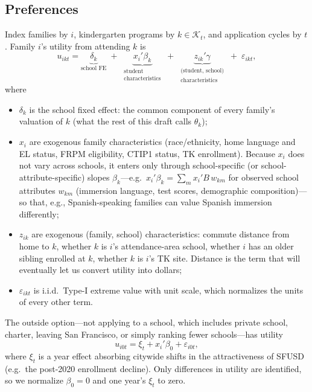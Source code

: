 \documentclass{article}
\begin{document}
\subsection{Preferences}
Index families by $i$, kindergarten programs by $k \in \mathcal{K}_t$, and application cycles by $t$. Family $i$'s utility from attending $k$ is
\[
u_{ikt} = \underbrace{\delta_k}_{\text{school FE}} \; + \; \underbrace{x_i'\beta_k}_{\substack{\text{student} \\ \text{characteristics}}} \; + \; \underbrace{z_{ik}'\gamma}_{\substack{\text{(student, school)} \\ \text{characteristics}}} \; + \; \varepsilon_{ikt},
\]
where
\begin{itemize}
    \item $\delta_k$ is the school fixed effect: the common component of every family's valuation of $k$ (what the rest of this draft calls $\theta_k$);
    \item $x_i$ are exogenous family characteristics (race/ethnicity, home language and EL status, FRPM eligibility, CTIP1 status, TK enrollment). Because $x_i$ does not vary across schools, it enters only through school-specific (or school-attribute-specific) slopes $\beta_k$---e.g.\ $x_i'\beta_k = \sum_m x_i' B\, w_{km}$ for observed school attributes $w_{km}$ (immersion language, test scores, demographic composition)---so that, e.g., Spanish-speaking families can value Spanish immersion differently;
    \item $z_{ik}$ are exogenous (family, school) characteristics: commute distance from home to $k$, whether $k$ is $i$'s attendance-area school, whether $i$ has an older sibling enrolled at $k$, whether $k$ is $i$'s TK site. Distance is the term that will eventually let us convert utility into dollars;
    \item $\varepsilon_{ikt}$ is i.i.d.\ Type-I extreme value with unit scale, which normalizes the units of every other term.
\end{itemize}
The outside option---not applying to a school, which includes private school, charter, leaving San Francisco, or simply ranking fewer schools---has utility
\[
u_{i0t} = \xi_t + x_i'\beta_0 + \varepsilon_{i0t},
\]
where $\xi_t$ is a year effect absorbing citywide shifts in the attractiveness of SFUSD (e.g.\ the post-2020 enrollment decline). Only differences in utility are identified, so we normalize $\beta_0 = 0$ and one year's $\xi_t$ to zero.
\end{document}
